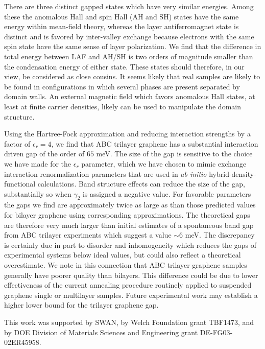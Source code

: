 \documentclass[twocolumn,prb,showpacs,preprintnumbers,amsmath,amssymb]{revtex4}
\begin{document}
There are three distinct gapped states which have very similar 
energies.  Among these the anomalous Hall and spin Hall (AH and SH) states 
have the same energy within mean-field theory, whereas the layer 
antiferromagnet state is distinct and is favored by inter-valley exchange because 
electrons with the same spin state have the same sense of layer polarization.   
We find that the difference in total energy
between LAF and  
AH/SH is two orders of magnitude smaller than the condensation 
energy of either state.  These states should therefore, in our view,
be considered as close cousins.  It seems likely that real samples are
likely to be found in configurations in which several phases are present 
separated by domain walls.  An external magnetic field which favors anomalous 
Hall states, at least at finite carrier densities, likely can be used to 
manipulate the domain structure.  

Using the Hartree-Fock approximation and reducing interaction strengths by a 
factor of $\epsilon_r = 4$, we find that ABC trilayer graphene has a substantial interaction 
driven gap of the order of $65$ meV.   The size of the gap is sensitive to the 
choice we have made for the $\epsilon_r$ parameter, which we have chosen to 
mimic exchange interaction renormalization parameters that are used in 
{\em ab initio} hybrid-density-functional calculations.   Band structure effects can reduce the size of the 
gap, substantially so when $\gamma_2$ is assigned a negative value. 
For favorable parameters the gaps we find are approximately twice as large as  
than those predicted values for bilayer graphene using corresponding approximations.
The theoretical gaps are therefore very much larger than 
initial estimates of a spontaneous band gap from ABC trilayer 
experiments which suggest a value
$\sim 6$ meV. \cite{trilayers1}  The discrepancy is certainly due in part to 
disorder and inhomogeneity which reduces the gaps of experimental systems 
below ideal values, but could also reflect a theoretical overestimate.  
We note in this connection that ABC trilayer graphene samples generally have poorer 
quality than bilayers.  This difference could be due to lower effectiveness of the 
current annealing procedure routinely applied to suspended graphene single or multilayer 
samples.  Future experimental work may establish a higher lower bound for the 
trilayer graphene gap.  



\acknowledgements 

This work was supported by SWAN, by Welch Foundation grant TBF1473,
and by DOE Division of Materials Sciences and Engineering grant DE-FG03-02ER45958.
\end{document}
